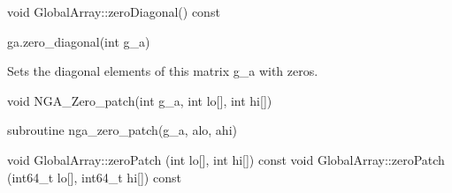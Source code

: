 \documentclass[12pt]{article}
\begin{document}
\begin{cxxapi}
\begin{cxxcode}
void GlobalArray::zeroDiagonal() const
\end{cxxcode}
\end{cxxapi}

\begin{pyapi}
\begin{pycode}
ga.zero_diagonal(int g_a)
\end{pycode}
\begin{funcargs}
\end{funcargs}
\end{pyapi}

\gcoll

\begin{desc}
Sets the diagonal elements of this matrix g_a with zeros.
\end{desc}


\begin{capi}
\begin{ccode}
void NGA_Zero_patch(int g_a, int lo[], int hi[])
\end{ccode}
\begin{funcargs}
\end{funcargs}
\end{capi}

\begin{fapi}
\begin{fcode}
subroutine nga_zero_patch(g_a, alo, ahi)
\end{fcode}
\begin{funcargs}
\end{funcargs}
\end{fapi}

\begin{cxxapi}
\begin{cxxcode}
void GlobalArray::zeroPatch (int lo[], int hi[]) const
void GlobalArray::zeroPatch (int64_t lo[], int64_t hi[]) const
\end{cxxcode}
\begin{funcargs}
\end{funcargs}
\end{cxxapi}
\end{document}
